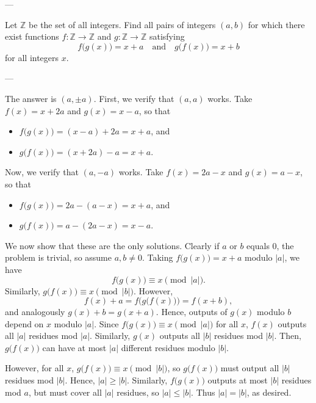 
---

Let $\mathbb Z$ be the set of all integers. Find all pairs of integers $(a,b)$ for which there exist functions $f:\mathbb Z\to\mathbb Z$ and $g:\mathbb Z\to\mathbb Z$ satisfying \[f\big(g(x)\big)=x+a\quad\text{and}\quad g\big(f(x)\big)=x+b\]
for all integers $x$.

---

The answer is $(a,\pm a)$. First, we verify that $(a,a)$ works. Take $f(x)=x+2a$ and $g(x)=x-a$, so that
\begin{itemize}[itemsep=0em]
    \item $f\big(g(x)\big)=(x-a)+2a=x+a$, and
    \item $g\big(f(x)\big)=(x+2a)-a=x+a$.
\end{itemize}
Now, we verify that $(a,-a)$ works. Take $f(x)=2a-x$ and $g(x)=a-x$, so that
\begin{itemize}[itemsep=0em]
    \item $f\big(g(x)\big)=2a-(a-x)=x+a$, and
    \item $g\big(f(x)\big)=a-(2a-x)=x-a$.
\end{itemize}
We now show that these are the only solutions. Clearly if $a$ or $b$ equals $0$, the problem is trivial, so assume $a,b\ne 0$. Taking $f\big(g(x)\big)=x+a$ modulo $|a|$, we have \[f\big(g(x)\big)\equiv x\pmod{|a|}.\]
Similarly, $g\big(f(x)\big)\equiv x\pmod{|b|}$. However, \[f(x)+a=f\Big(g\big(f(x)\big)\Big)=f(x+b),\]
and analogously $g(x)+b=g(x+a)$. Hence, outputs of $g(x)$ modulo $b$ depend on $x$ modulo $|a|$. Since $f\big(g(x)\big)\equiv x\pmod{|a|}$ for all $x$, $f(x)$ outputs all $|a|$ residues mod $|a|$. Similarly, $g(x)$ outputs all $|b|$ residues mod $|b|$. Then, $g\big(f(x)\big)$ can have at most $|a|$ different residues modulo $|b|$.

However, for all $x$, $g\big(f(x)\big)\equiv x\pmod{|b|}$, so $g\big(f(x)\big)$ must output all $|b|$ residues mod $|b|$. Hence, $|a|\ge |b|$. Similarly, $f\big(g(x)\big)$ outputs at most $|b|$ residues mod $a$, but must cover all $|a|$ residues, so $|a|\le |b|$. Thus $|a|=|b|$, as desired.


